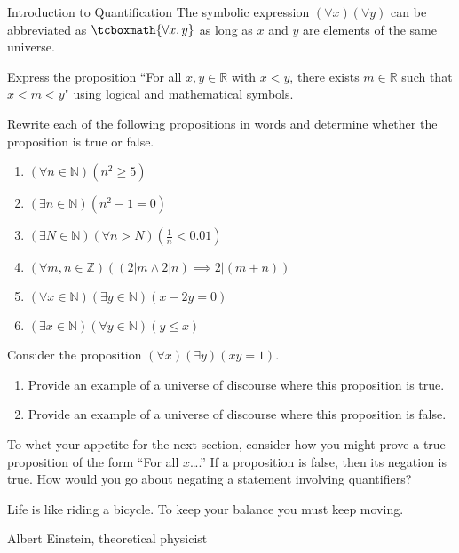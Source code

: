 \begin{section}{Introduction to Quantification}
The symbolic expression $(\forall x)(\forall y)$ can be abbreviated as $\tcboxmath{\forall x,y}$ as long as $x$ and $y$ are elements of the same universe.

\begin{problem}
Express the proposition ``For all $x,y\in\mathbb{R}$ with $x<y$, there exists $m\in\mathbb{R}$ such that $x<m<y$" using logical and mathematical symbols.
\end{problem}

\begin{problem}
Rewrite each of the following propositions in words and determine whether the proposition is true or false.
\begin{enumerate}[label=\textrm{(\alph*)}]
\item $(\forall n \in \mathbb{N})(n^2 \geq 5)$
\item $(\exists n \in \mathbb{N})(n^2-1=0)$
\item $(\exists N \in \mathbb{N})(\forall  n > N)(\frac{1}{n} < 0.01)$
\item $(\forall m, n \in \mathbb{Z})((2|m \wedge 2|n) \implies 2|(m+n))$
\item $(\forall x \in \mathbb{N})(\exists y \in \mathbb{N})(x-2y=0)$
\item $(\exists x \in \mathbb{N})(\forall y \in \mathbb{N})(y \leq x)$
\end{enumerate}
\end{problem}

\begin{problem}
Consider the proposition $(\forall x)(\exists y)(xy=1)$.
\begin{enumerate}[label=\textrm{(\alph*)}]
\item Provide an example of a universe of discourse where this proposition is true.
\item Provide an example of a universe of discourse where this proposition is false.
\end{enumerate}
\end{problem}

To whet your appetite for the next section, consider how you might prove a true proposition of the form ``For all $x$\ldots.'' If a proposition is false, then its negation is true. How would you go about negating a statement involving quantifiers? 


\epigraph{Life is like riding a bicycle. To keep your balance you must keep moving.}{Albert Einstein, theoretical physicist}

\end{section}